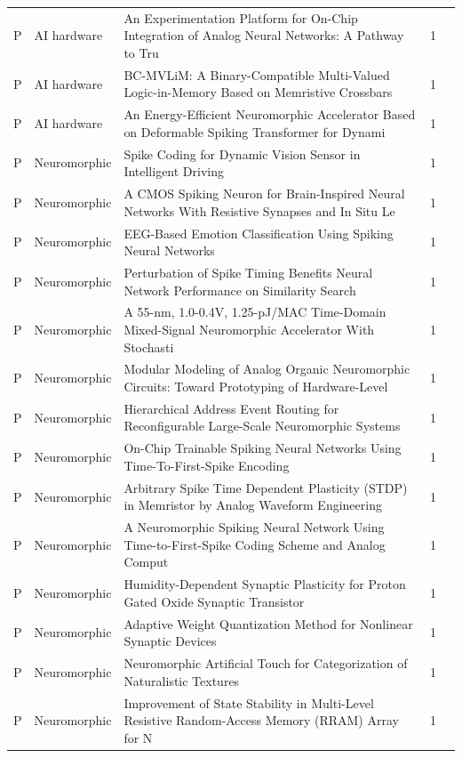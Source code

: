 \documentclass[10pt]{article}
\begin{document}
\begin{longtable}{@{}llL{8.6cm}lL{4.2cm}@{}}
P & AI hardware & An Experimentation Platform for On-Chip Integration of Analog Neural Networks: A Pathway to Tru & 1 &  \\
P & AI hardware & BC-MVLiM: A Binary-Compatible Multi-Valued Logic-in-Memory Based on Memristive Crossbars & 1 &  \\
P & AI hardware & An Energy-Efficient Neuromorphic Accelerator Based on Deformable Spiking Transformer for Dynami & 1 &  \\
P & Neuromorphic & Spike Coding for Dynamic Vision Sensor in Intelligent Driving & 1 &  \\
P & Neuromorphic & A CMOS Spiking Neuron for Brain-Inspired Neural Networks With Resistive Synapses and In Situ Le & 1 &  \\
P & Neuromorphic & EEG-Based Emotion Classification Using Spiking Neural Networks & 1 &  \\
P & Neuromorphic & Perturbation of Spike Timing Benefits Neural Network Performance on Similarity Search & 1 &  \\
P & Neuromorphic & A 55-nm, 1.0-0.4V, 1.25-pJ/MAC Time-Domain Mixed-Signal Neuromorphic Accelerator With Stochasti & 1 &  \\
P & Neuromorphic & Modular Modeling of Analog Organic Neuromorphic Circuits: Toward Prototyping of Hardware-Level  & 1 &  \\
P & Neuromorphic & Hierarchical Address Event Routing for Reconfigurable Large-Scale Neuromorphic Systems & 1 &  \\
P & Neuromorphic & On-Chip Trainable Spiking Neural Networks Using Time-To-First-Spike Encoding & 1 &  \\
P & Neuromorphic & Arbitrary Spike Time Dependent Plasticity (STDP) in Memristor by Analog Waveform Engineering & 1 &  \\
P & Neuromorphic & A Neuromorphic Spiking Neural Network Using Time-to-First-Spike Coding Scheme and Analog Comput & 1 &  \\
P & Neuromorphic & Humidity-Dependent Synaptic Plasticity for Proton Gated Oxide Synaptic Transistor & 1 &  \\
P & Neuromorphic & Adaptive Weight Quantization Method for Nonlinear Synaptic Devices & 1 &  \\
P & Neuromorphic & Neuromorphic Artificial Touch for Categorization of Naturalistic Textures & 1 &  \\
P & Neuromorphic & Improvement of State Stability in Multi-Level Resistive Random-Access Memory (RRAM) Array for N & 1 &  \\

\end{longtable}
\end{document}
